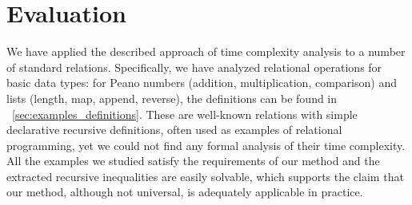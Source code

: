 \section{Evaluation}
\label{sec:evaluation}

We have applied the described approach of time complexity analysis to a number of standard \mK relations. Specifically, we have analyzed relational operations for basic data types: for Peano
numbers (addition, multiplication, comparison) and lists (length, map, append, reverse), the definitions can be found in \appendixword~\ref{sec:examples_definitions}. These are well-known relations with simple declarative recursive definitions, often used as examples
of relational programming, yet we could not find any formal analysis of their time complexity. All the examples we studied satisfy the requirements of our method and the extracted recursive
inequalities are easily solvable, which supports the claim that our method, although not universal, is adequately applicable in practice.

